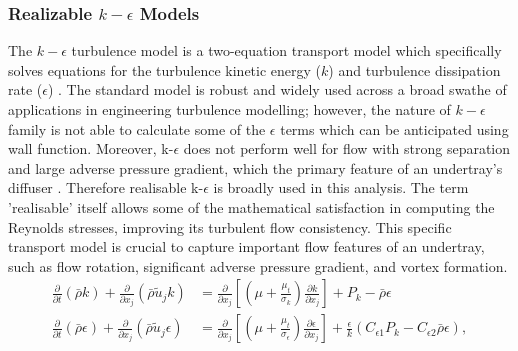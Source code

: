 \subsubsection{Realizable $k-\epsilon$ Models}
The $k-\epsilon$ turbulence model is a two-equation transport model which specifically solves equations for the turbulence kinetic energy ($k$) and turbulence dissipation rate ($\epsilon$) \cite{Andersson2011Turbulent-flowModelling}\cite{Mansour1989Near-wallModeling}\cite{Ansys2006ModelingFlows}. The standard model is robust and widely used across a broad swathe of applications in engineering turbulence modelling; however, the nature of $k-\epsilon$ family is not able to calculate some of the $\epsilon$ terms which can be anticipated using wall function. Moreover, k-$\epsilon$ does not perform well for flow with strong separation and large adverse pressure gradient, which the primary feature of an undertray's diffuser \cite{Ansys2006ModelingFlows}.  Therefore realisable k-$\epsilon$ is broadly used in this analysis. The term 'realisable' itself allows some of the mathematical satisfaction in computing the Reynolds stresses, improving its turbulent flow consistency. This specific transport model is crucial to capture important flow features of an undertray, such as flow rotation, significant adverse pressure gradient, and vortex formation.
\begin{align}
\frac{\partial}{\partial t}(\bar{\rho} k)+\frac{\partial}{\partial x_j}(\bar{\rho} \tilde{u}_j k) & = \frac{\partial}{\partial x_j} \left[ \left(\mu + \frac{\mu_t}{\sigma_k}\right) \frac{\partial k}{\partial x_j} \right] +P_k-\bar{\rho}\epsilon \\ 
\frac{\partial }{\partial t}(\bar{\rho} \epsilon)+\frac{\partial}{\partial x_j}(\bar{\rho} \tilde{u}_j \epsilon) & = \frac{\partial}{\partial x_j} \left[ \left(\mu + \frac{\mu_t}{\sigma_{\epsilon}}\right) \frac{\partial \epsilon}{\partial x_j} \right] + \frac{\epsilon}{k}(C_{\epsilon 1}P_k-C_{\epsilon 2}\bar{\rho} \epsilon),
\end{align} 

